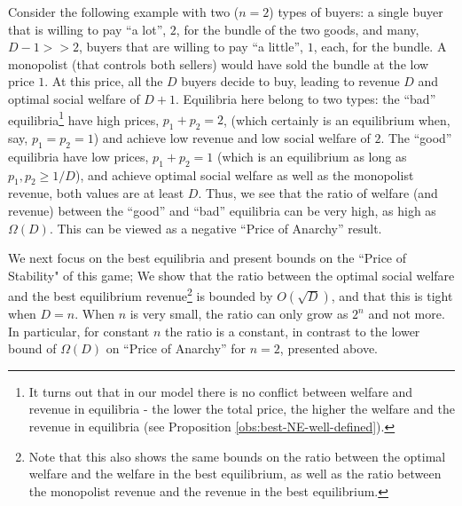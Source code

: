 Consider the following example with two ($n=2$) types of buyers:
a single buyer that is willing to pay ``a lot'', $2$,
for the bundle of the two goods, and many,
$D-1>>2$, buyers that are willing to pay ``a little'', $1$, each, for the bundle.
A monopolist (that controls both sellers) would have sold
the bundle at the low price $1$. At this price, all the $D$ buyers decide to buy, leading to revenue $D$ and optimal social welfare of $D+1$.
Equilibria here belong to two types:
the ``bad'' equilibria\footnote{It turns out that in our model there is no conflict between welfare and revenue in equilibria - the lower the total price, the higher the welfare and the revenue in equilibria (see Proposition \ref{obs:best-NE-well-defined}).}
have high prices, $p_1+p_2=2$, (which certainly is
an equilibrium when, say, $p_1 = p_2 = 1$) and achieve low revenue and
low social welfare of $2$.
The ``good'' equilibria have low prices, $p_1+p_2=1$ (which is an equilibrium as long
as $p_1, p_2 \ge 1/D$), and achieve optimal social welfare as well as the monopolist revenue, both values are at least $D$.
Thus, we see that the ratio of welfare (and revenue) between the ``good'' and ``bad'' equilibria can be very high, as high as $\Omega(D)$.
This can be viewed as a negative ``Price of Anarchy''  result.  %

We next focus on the best equilibria and  present bounds on the ``Price of Stability" of this game;
	We show that the ratio between the optimal social welfare and the best equilibrium revenue\footnote{Note that this also shows  the same bounds on the ratio between the optimal welfare and the welfare in the best equilibrium, as well as the ratio between the monopolist revenue and the revenue in the best equilibrium.}
	is bounded by $O(\sqrt{D})$, and that this is tight when $D=n$.
	When $n$ is very small, the ratio can only grow as $2^n$ and not more. In particular, for constant $n$ the ratio is a constant, in contrast to the lower bound of $\Omega(D)$ on ``Price of Anarchy'' for $n=2$, presented above.
	


